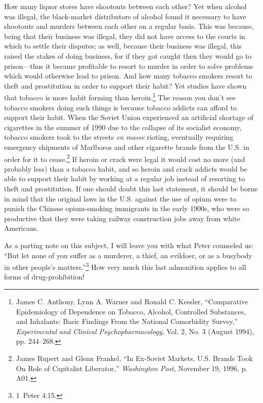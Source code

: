 \documentclass[letterpaper,12pt]{article}
\begin{document}
How many liquor stores have shootouts between each other? Yet when alcohol was illegal, the black-market distributors of alcohol found it necessary to have shootouts and murders between each other on a regular basis. This was because, being that their business was illegal, they did not have access to the courts in which to settle their disputes; as well, because their business was illegal, this raised the stakes of doing business, for if they got caught then they would go to prison---thus it became profitable to resort to murder in order to solve problems which would otherwise lead to prison. And how many tobacco smokers resort to theft and prostitution in order to support their habit? Yet studies have shown that tobacco is more habit forming than heroin.\footnote{James C. Anthony, Lynn A. Warner and Ronald C. Kessler, ``Comparative Epidemiology of Dependence on Tobacco, Alcohol, Controlled Substances, and Inhalants: Basic Findings From the National Comorbidity Survey,'' \emph{Experimental and Clinical Psychopharmacology}, Vol. 2, No. 3 (August 1994), pp. 244--268.} The reason you don't see tobacco smokers doing such things is because tobacco addicts can afford to support their habit. When the Soviet Union experienced an artificial shortage of cigarettes in the summer of 1990 due to the collapse of its socialist economy, tobacco smokers took to the streets \emph{en masse} rioting, eventually requiring emergency shipments of Marlboros and other cigarette brands from the U.S. in order for it to cease.\footnote{James Rupert and Glenn Frankel, ``In Ex-Soviet Markets, U.S. Brands Took On Role of Capitalist Liberator,'' \emph{Washington Post}, November 19, 1996, p. A01.} If heroin or crack were legal it would cost no more (and probably less) than a tobacco habit, and so heroin and crack addicts would be able to support their habit by working at a regular job instead of resorting to theft and prostitution. If one should doubt this last statement, it should be borne in mind that the original laws in the U.S. against the use of opium were to punish the Chinese opium-smoking immigrants in the early 1900s, who were so productive that they were taking railway construction jobs away from white Americans.

As a parting note on this subject, I will leave you with what Peter counseled us: ``But let none of you suffer as a murderer, a thief, an evildoer, or as a busybody in other people's matters.''\footnote{1~Peter 4:15.} How very much this last admonition applies to all forms of drug-prohibition!
\end{document}
